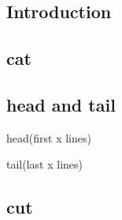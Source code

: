 
\subsection{Introduction}
 
\subsection{cat}

\subsection{head and tail}
head(first x lines)

tail(last x lines)

\subsection{cut}


